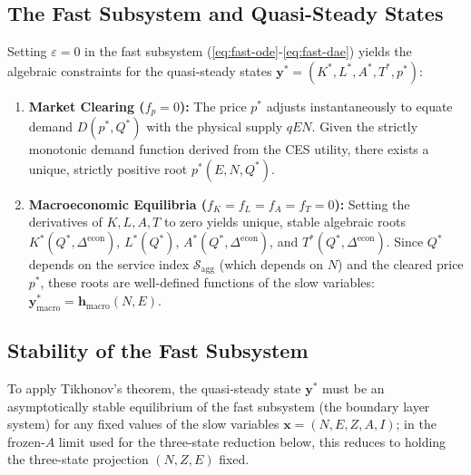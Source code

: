 \documentclass[twocolumn,10pt]{article}
\begin{document}
\subsection{The Fast Subsystem and Quasi-Steady States}
Setting \(\varepsilon = 0\) in the fast subsystem (\ref{eq:fast-ode}-\ref{eq:fast-dae}) yields the algebraic constraints for the quasi-steady states \(\mathbf{y}^* = (K^*, L^*, A^*, T^*, p^*)\):
\begin{enumerate}
    \item \textbf{Market Clearing (\(f_p = 0\)):} The price \(p^*\) adjusts instantaneously to equate demand \(D(p^*, Q^*)\) with the physical supply \(q E N\). Given the strictly monotonic demand function derived from the CES utility, there exists a unique, strictly positive root \(p^*(E, N, Q^*)\).
    \item \textbf{Macroeconomic Equilibria (\(f_K=f_L=f_A=f_T=0\)):} Setting the derivatives of \(K, L, A, T\) to zero yields unique, stable algebraic roots \(K^*(Q^*, \Delta^{\text{econ}})\), \(L^*(Q^*)\), \(A^*(Q^*, \Delta^{\text{econ}})\), and \(T^*(Q^*, \Delta^{\text{econ}})\). Since \(Q^*\) depends on the service index \(\mathcal{S}_{\text{agg}}\) (which depends on \(N\)) and the cleared price \(p^*\), these roots are well-defined functions of the slow variables: \(\mathbf{y}_{\text{macro}}^* = \mathbf{h}_{\text{macro}}(N, E)\).
\end{enumerate}

\subsection{Stability of the Fast Subsystem}
To apply Tikhonov's theorem, the quasi-steady state \(\mathbf{y}^*\) must be an asymptotically stable equilibrium of the fast subsystem (the boundary layer system) for any fixed values of the slow variables \(\mathbf{x} = (N,E,Z,A,I)\); in the frozen-\(A\) limit used for the three-state reduction below, this reduces to holding the three-state projection \((N,Z,E)\) fixed.
\end{document}
